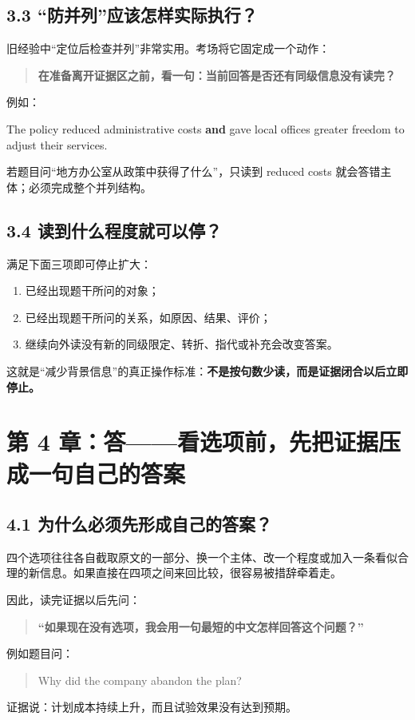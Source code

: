 \documentclass[11pt,a4paper]{ctexart}
\newcommand{\kw}[1]{\textbf{#1}}
\begin{document}
\subsection{3.3 “防并列”应该怎样实际执行？}
旧经验中“定位后检查并列”非常实用。考场将它固定成一个动作：
\begin{quote}
\kw{在准备离开证据区之前，看一句：当前回答是否还有同级信息没有读完？}
\end{quote}
例如：
\begin{eng}[例 2：答案可能藏在第二个并列项]
The policy reduced administrative costs \textbf{and} gave local offices greater freedom to adjust their services.
\end{eng}
若题目问“地方办公室从政策中获得了什么”，只读到 reduced costs 就会答错主体；必须完成整个并列结构。

\subsection{3.4 读到什么程度就可以停？}
满足下面三项即可停止扩大：
\begin{enumerate}
  \item 已经出现题干所问的对象；
  \item 已经出现题干所问的关系，如原因、结果、评价；
  \item 继续向外读没有新的同级限定、转折、指代或补充会改变答案。
\end{enumerate}
这就是“减少背景信息”的真正操作标准：\kw{不是按句数少读，而是证据闭合以后立即停止。}

\section{第 4 章：答——看选项前，先把证据压成一句自己的答案}

\subsection{4.1 为什么必须先形成自己的答案？}
四个选项往往各自截取原文的一部分、换一个主体、改一个程度或加入一条看似合理的新信息。如果直接在四项之间来回比较，很容易被措辞牵着走。

因此，读完证据以后先问：
\begin{quote}
\kw{“如果现在没有选项，我会用一句最短的中文怎样回答这个问题？”}
\end{quote}

例如题目问：
\begin{quote}
Why did the company abandon the plan?
\end{quote}
证据说：计划成本持续上升，而且试验效果没有达到预期。
\end{document}
